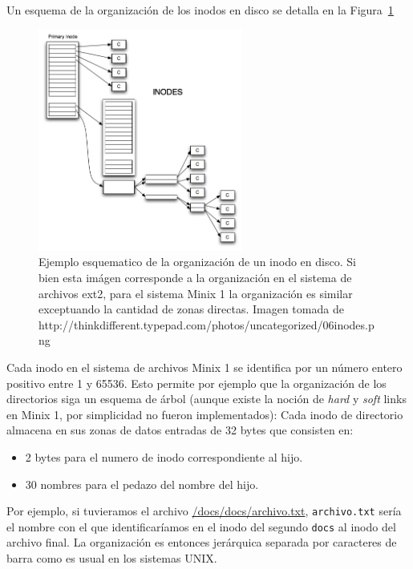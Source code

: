 Un esquema de la organizaci\'on de los inodos en disco se detalla en la Figura~\ref{fig::inodes}

\begin{figure}[H]
	\caption{Ejemplo esquematico de la organizaci\'on de un inodo en disco. Si bien esta im\'agen corresponde
	a la organizaci\'on en el sistema de archivos ext2, para el sistema Minix 1 la organizaci\'on es similar exceptuando
	la cantidad de zonas directas. Imagen tomada de http://thinkdifferent.typepad.com/photos/uncategorized/06inodes.png}
	\label{fig::inodes}
	\centering
	\includegraphics[width=0.6\textwidth]{inodes.png}
\end{figure} 

Cada inodo en el sistema de archivos Minix 1 se identifica por un n\'umero entero positivo entre 1 y 65536. Esto permite por
ejemplo que la organizaci\'on de los directorios siga un esquema de \'arbol (aunque existe la noci\'on de \textit{hard} y \textit{soft}
links en Minix 1, por simplicidad no fueron implementados): Cada inodo de directorio almacena en sus zonas de datos entradas de 32 bytes
que consisten en:

\begin{itemize}
	\item 2 bytes para el numero de inodo correspondiente al hijo.
	\item 30 nombres para el pedazo del nombre del hijo.
\end{itemize}

Por ejemplo, si tuvieramos el archivo \url{/docs/docs/archivo.txt}, \texttt{archivo.txt} ser\'ia el nombre con el que identificar\'iamos en
el inodo del segundo \texttt{docs} al inodo del archivo final. La organizaci\'on es entonces jer\'arquica separada por caracteres de barra
como es usual en los sistemas UNIX.

